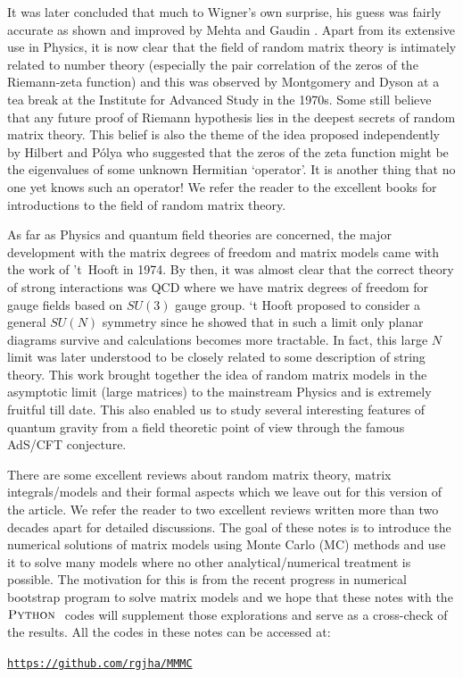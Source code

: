\documentclass[11pt]{article}
\newcommand{\PY}{\textsc{Python }}
\begin{document}
It was later concluded that much to Wigner's own surprise, 
his guess was fairly accurate as shown and improved by Mehta \cite{MEHTA1960395} and 
Gaudin \cite{GAUDIN1961447}. Apart from its extensive use in Physics, it is now clear that 
the field of random matrix theory is intimately related to number theory 
(especially the pair correlation of the zeros of the Riemann-zeta function) and this was 
observed by Montgomery and Dyson at a tea break at the Institute for Advanced 
Study in the 1970s. Some still believe that any future proof of Riemann hypothesis lies in the
deepest secrets of random matrix theory. This belief is also the theme of the idea proposed 
independently by  Hilbert and P\'{o}lya who suggested that the zeros of the zeta function 
might be the eigenvalues of some unknown Hermitian `operator'. It is another thing that 
no one yet knows such an operator! We refer the reader to the excellent books 
\cite{Meh2004, Akemann:2011csh} for introductions to the field of random matrix theory. 

As far as Physics and quantum field theories are concerned, the major development
with the matrix degrees of freedom and matrix models came 
with the work of 't~Hooft in 1974. By then, it was almost clear that the correct theory of 
strong interactions was QCD where we have matrix degrees of freedom for gauge fields
based on $SU(3)$ gauge group. `t Hooft proposed to consider a general $SU(N)$ 
symmetry since he showed that in such a limit only planar diagrams survive and calculations becomes
more tractable. In fact, this large $N$ limit was later understood to be closely related to some
description of string theory. This work brought together the idea of random matrix models
in the asymptotic limit (large matrices) to the mainstream Physics and is extremely fruitful till date. 
This also enabled us to study several interesting features of quantum gravity 
from a field theoretic point of view through the famous AdS/CFT conjecture.

There are some excellent reviews about random matrix theory, matrix integrals/models and their formal aspects 
which we leave out for this version of the article. We refer the reader to two excellent reviews written more than two decades 
apart \cite{DiFrancesco:1993cyw,Eynard:2015aea} for detailed discussions. 
The goal of these notes is to introduce the numerical solutions of matrix models using 
Monte Carlo (MC) methods and use it to solve many models where no other analytical/numerical 
treatment is possible. The motivation for this is from the recent progress in numerical bootstrap program to 
solve matrix models and we hope that these notes with the $\PY$ codes will supplement
those explorations and serve as a cross-check of the results. All the codes in these notes can be accessed at:  
\begin{center} \texttt{\href{https://github.com/rgjha/MMMC}{https://github.com/rgjha/MMMC}} \end{center}
\end{document}
